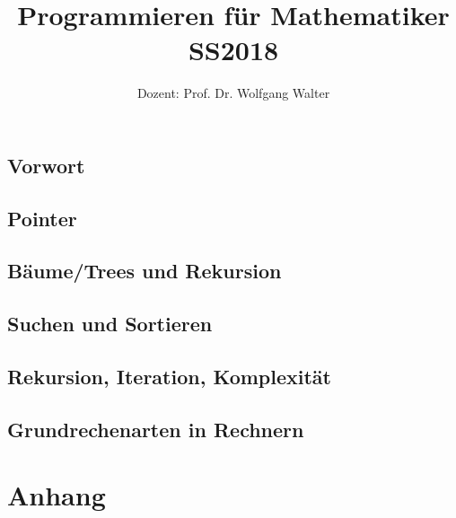 \documentclass[ngerman,a4paper,order=firstname]{../../texmf/tex/latex/mathscript/mathscript}
\title{\textbf{Programmieren für Mathematiker SS2018}}
\author{Dozent: Prof. Dr. Wolfgang Walter}
\begin{document}
\pagestyle{plain}

\maketitle

\hypertarget{tocpage}{}
\tableofcontents
{}

\pagebreak
{}
\pagestyle{fancy}

\chapter*{Vorwort}


\chapter{Pointer}





\chapter{Bäume/Trees und Rekursion}


\chapter{Suchen und Sortieren}









\chapter{Rekursion, Iteration, Komplexität}


\chapter{Grundrechenarten in Rechnern}




\part*{Anhang}
\appendix


\printindex
\end{document}
